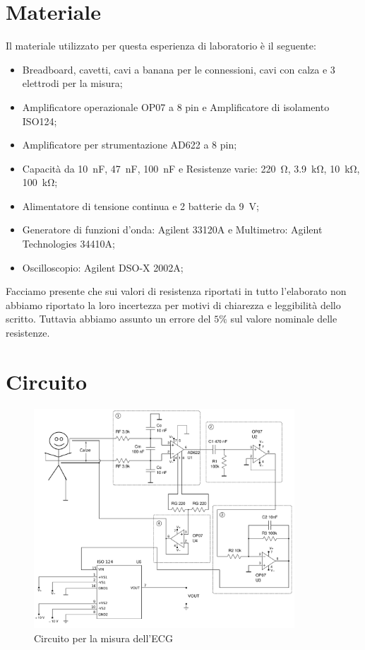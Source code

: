 \section*{Materiale}

Il materiale utilizzato per questa esperienza di laboratorio è il seguente:

\begin{itemize} \itemsep0pt \parskip0pt 
    \item{Breadboard, cavetti, cavi a banana per le connessioni, cavi con calza e 3 elettrodi per la misura;}
    \item{Amplificatore operazionale OP07 a 8 pin e Amplificatore di isolamento ISO124;}
    \item{Amplificatore per strumentazione AD622 a 8 pin;}
    \item{Capacità da \SI{10}{\nano\farad}, \SI{47}{\nano\farad}, \SI{100}{\nano\farad} e Resistenze varie: \SI{220}{\ohm}, \SI{3.9}{\kilo\ohm}, \SI{10}{\kilo\ohm}, \SI{100}{\kilo\ohm};}
    \item{Alimentatore di tensione continua e 2 batterie da \SI{9}{\volt};}
    \item{Generatore di funzioni d'onda: Agilent 33120A e Multimetro: Agilent Technologies 34410A;}
    \item{Oscilloscopio: Agilent DSO-X 2002A;}
\end{itemize}

Facciamo presente che sui valori di resistenza riportati in tutto l'elaborato non abbiamo riportato la loro incertezza per motivi di chiarezza e leggibilità dello scritto. Tuttavia abbiamo assunto un errore del $5\%$ sul valore nominale delle resistenze.

\section*{Circuito}

\begin{figure}[H]
    \centering
	\includegraphics[width=0.87\textwidth]{figure/s.pdf}
	\caption{Circuito per la misura dell'ECG}
	\label{fig:ecg}
\end{figure}

